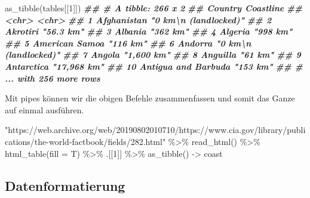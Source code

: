 \documentclass[
  ngerman,
]{article}
\newenvironment{Shaded}{\begin{snugshade}}{\end{snugshade}}
\newcommand{\AttributeTok}[1]{\textcolor[rgb]{0.77,0.63,0.00}{#1}}
\newcommand{\DecValTok}[1]{\textcolor[rgb]{0.00,0.00,0.81}{#1}}
\newcommand{\DocumentationTok}[1]{\textcolor[rgb]{0.56,0.35,0.01}{\textbf{\textit{#1}}}}
\newcommand{\FunctionTok}[1]{\textcolor[rgb]{0.00,0.00,0.00}{#1}}
\newcommand{\NormalTok}[1]{#1}
\newcommand{\OtherTok}[1]{\textcolor[rgb]{0.56,0.35,0.01}{#1}}
\newcommand{\SpecialCharTok}[1]{\textcolor[rgb]{0.00,0.00,0.00}{#1}}
\newcommand{\StringTok}[1]{\textcolor[rgb]{0.31,0.60,0.02}{#1}}
\begin{document}
\begin{Shaded}
\begin{Highlighting}[]
\FunctionTok{as\_tibble}\NormalTok{(tables[[}\DecValTok{1}\NormalTok{]])}
\DocumentationTok{\#\# \# A tibble: 266 x 2}
\DocumentationTok{\#\#    Country             Coastline                     }
\DocumentationTok{\#\#    \textless{}chr\textgreater{}               \textless{}chr\textgreater{}                         }
\DocumentationTok{\#\#  1 Afghanistan         "0 km\textbackslash{}n          (landlocked)"}
\DocumentationTok{\#\#  2 Akrotiri            "56.3 km"                     }
\DocumentationTok{\#\#  3 Albania             "362 km"                      }
\DocumentationTok{\#\#  4 Algeria             "998 km"                      }
\DocumentationTok{\#\#  5 American Samoa      "116 km"                      }
\DocumentationTok{\#\#  6 Andorra             "0 km\textbackslash{}n          (landlocked)"}
\DocumentationTok{\#\#  7 Angola              "1,600 km"                    }
\DocumentationTok{\#\#  8 Anguilla            "61 km"                       }
\DocumentationTok{\#\#  9 Antarctica          "17,968 km"                   }
\DocumentationTok{\#\# 10 Antigua and Barbuda "153 km"                      }
\DocumentationTok{\#\# \# ... with 256 more rows}
\end{Highlighting}
\end{Shaded}

Mit pipes können wir die obigen Befehle zusammenfassen und somit das Ganze auf einmal ausführen.

\begin{Shaded}
\begin{Highlighting}[]
\StringTok{"https://web.archive.org/web/20190802010710/https://www.cia.gov/library/publications/the{-}world{-}factbook/fields/282.html"} \SpecialCharTok{\%\textgreater{}\%}
  \FunctionTok{read\_html}\NormalTok{() }\SpecialCharTok{\%\textgreater{}\%}
  \FunctionTok{html\_table}\NormalTok{(}\AttributeTok{fill =}\NormalTok{ T) }\SpecialCharTok{\%\textgreater{}\%}
\NormalTok{  .[[}\DecValTok{1}\NormalTok{]] }\SpecialCharTok{\%\textgreater{}\%}
  \FunctionTok{as\_tibble}\NormalTok{() }\OtherTok{{-}\textgreater{}}\NormalTok{ coast}
\end{Highlighting}
\end{Shaded}

\hypertarget{datenformatierung}{%
\subsection{Datenformatierung}\label{datenformatierung}}
\end{document}
